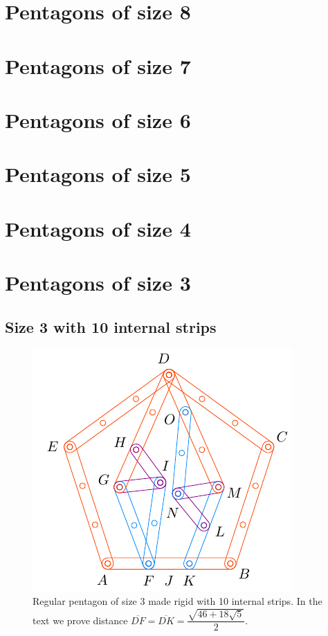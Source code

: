 \documentclass[11pt]{article}
\begin{document}
\section{Pentagons of size 8}

\section{Pentagons of size 7}

\section{Pentagons of size 6}

\section{Pentagons of size 5}

\section{Pentagons of size 4}

\section{Pentagons of size 3}

\subsection{Size 3 with 10 internal strips}

\begin{figure}[H]
\centering
\includegraphics[scale=1.2]{3/penta3-10a}
\caption{Regular pentagon of size 3 made rigid with 10 internal strips. In the text we prove distance $\overline{DF} = \overline{DK} = \dfrac{\sqrt{46+18\sqrt5}}2$.}
\label{fig:penta3-10a}
\end{figure}
\end{document}
